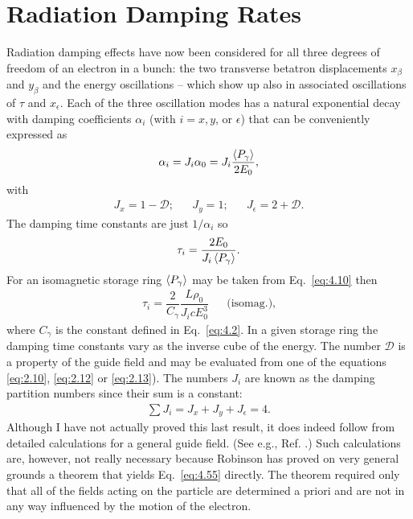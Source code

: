 \documentclass[../sands-adaptation.tex]{subfiles}
\begin{document}
\section{Radiation Damping Rates}\label{sec:4.4}

Radiation damping effects have now been considered for all three degrees of freedom of an electron in a bunch: the two transverse betatron displacements $x_\beta$ and $y_\beta$ and the energy oscillations -- which show up also in associated oscillations of $\tau$ and $x_\epsilon$. Each of the three oscillation modes has a natural exponential decay with damping coefficients $\alpha_i$ (with $i = x, y$, or $\epsilon$) that can be conveniently expressed as
\begin{align}
	\alpha_i = J_i \alpha_0 = J_i \dfrac{\left< P_\gamma \right>}{2 E_0},
\end{align}
with
\begin{align}
	J_x = 1 - \mathscr{D};&& J_y = 1;&& J_\epsilon = 2 + \mathscr{D}.
\end{align}
The damping time constants are just $1/\alpha_i$ so
\begin{align} \label{eq:4.53}
	\tau_i = \dfrac{2 E_0}{J_i \left< P_\gamma \right>}.
\end{align}
For an isomagnetic storage ring $\left< P_\gamma \right>$ may be taken from Eq.~\eqref{eq:4.10} then
\begin{align} \label{eq:4.54}
	\tau_i = \dfrac{2}{C_\gamma} \dfrac{L \rho_0}{J_i c E_0^3} && \text{(isomag.)},
\end{align}
where $C_\gamma$ is the constant defined in Eq.~\ref{eq:4.2}. In a given storage ring the damping
time constants vary as the inverse cube of the energy. The number $\mathscr{D}$ is a property
 of the guide field and may be evaluated from one of the equations \eqref{eq:2.10}, \eqref{eq:2.12}
 or \eqref{eq:2.13}). The numbers $J_i$ are known as the damping partition numbers since their sum is a constant:
\begin{align} \label{eq:4.55}
	\sum J_i = J_x + J_y + J_\epsilon = 4.
\end{align}
Although I have not actually proved this last result, it does indeed follow from detailed calculations for a general guide field. (See e.g., Ref. \cite{5}.) Such calculations are, however, not really necessary because Robinson has proved on very general grounds a theorem that yields Eq.~\eqref{eq:4.55} directly. The theorem required only that all of the fields acting on the particle are determined a priori and are not in any way influenced by the motion of the electron.
\end{document}
